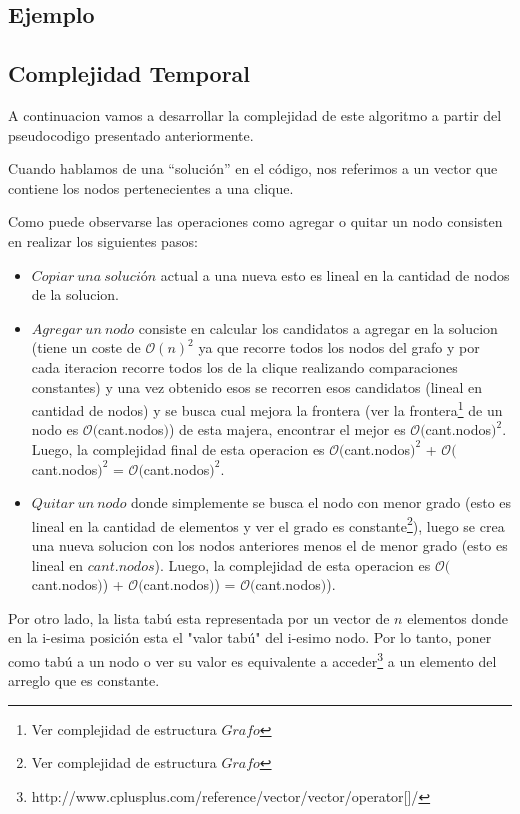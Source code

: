 \subsection{Ejemplo}
\subsection{Complejidad Temporal}

 A continuacion vamos a desarrollar la complejidad de este algoritmo a partir del pseudocodigo presentado anteriormente. \newline

 Cuando hablamos de una ``solución'' en el código, nos referimos a un vector que contiene los nodos pertenecientes a una clique. \newline

 Como puede observarse las operaciones como agregar o quitar un nodo consisten en realizar los siguientes pasos: \newline
\begin{itemize}
 \item $Copiar\ una\ solución$ actual a una nueva esto es lineal en la cantidad de nodos de la solucion.
 \item $Agregar\ un\ nodo$ consiste en calcular los candidatos a agregar en la solucion (tiene un coste de $\mathcal{O}(n)^{2}$ ya que recorre todos los nodos del grafo y por cada iteracion recorre todos los de la clique realizando comparaciones constantes) y una vez obtenido esos se recorren esos candidatos (lineal en cantidad de nodos) y se busca cual mejora la frontera (ver la frontera\footnote{Ver complejidad de estructura $Grafo$} de un nodo es $\mathcal{O}($cant.nodos$)$) de esta majera, encontrar el mejor es $\mathcal{O}($cant.nodos$)^{2}$. Luego, la complejidad final de esta operacion es $\mathcal{O}($cant.nodos$)^{2}$ + $\mathcal{O}($cant.nodos$)^{2}$ = $\mathcal{O}($cant.nodos$)^{2}$.
 \item $Quitar\ un\ nodo$ donde simplemente se busca el nodo con menor grado (esto es lineal en la cantidad de elementos y ver el grado es constante\footnote{Ver complejidad de estructura $Grafo$}), luego se crea una nueva solucion con los nodos anteriores menos el de menor grado (esto es lineal en $cant.nodos$). Luego, la complejidad de esta operacion es $\mathcal{O}($cant.nodos$)$) + $\mathcal{O}($cant.nodos$)$) = $\mathcal{O}($cant.nodos$)$).
\end{itemize}

 Por otro lado, la lista tabú esta representada por un vector de $n$ elementos donde en la i-esima posición esta el "valor tabú" del i-esimo nodo. Por lo tanto, poner como tabú a un nodo o ver su valor es equivalente a acceder\footnote{http://www.cplusplus.com/reference/vector/vector/operator[]/} a un elemento del arreglo que es constante.\newline

